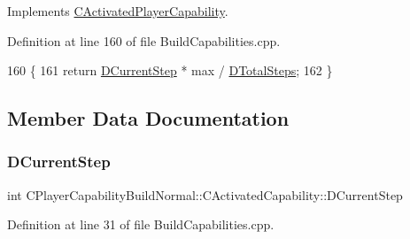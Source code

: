 Implements \hyperlink{classCActivatedPlayerCapability_a405dc6076058006a4f801727de4cfe4d}{C\+Activated\+Player\+Capability}.



Definition at line 160 of file Build\+Capabilities.\+cpp.


\begin{DoxyCode}
160                                                                             \{
161     \textcolor{keywordflow}{return} \hyperlink{classCPlayerCapabilityBuildNormal_1_1CActivatedCapability_ab6e20b5de47d912d9e38c2e8395f1ad1}{DCurrentStep} * max / \hyperlink{classCPlayerCapabilityBuildNormal_1_1CActivatedCapability_a50e3103232671fc231348e7a86c1fed5}{DTotalSteps};
162 \}
\end{DoxyCode}


\subsection{Member Data Documentation}
\hypertarget{classCPlayerCapabilityBuildNormal_1_1CActivatedCapability_ab6e20b5de47d912d9e38c2e8395f1ad1}{}\label{classCPlayerCapabilityBuildNormal_1_1CActivatedCapability_ab6e20b5de47d912d9e38c2e8395f1ad1} 
\subsubsection{\texorpdfstring{D\+Current\+Step}{DCurrentStep}}
{\footnotesize\ttfamily int C\+Player\+Capability\+Build\+Normal\+::\+C\+Activated\+Capability\+::\+D\+Current\+Step\hspace{0.3cm}{\ttfamily [protected]}}



Definition at line 31 of file Build\+Capabilities.\+cpp.

\hypertarget{classCPlayerCapabilityBuildNormal_1_1CActivatedCapability_a8997bc10da71f5df340096cd0d717d84}{}\label{classCPlayerCapabilityBuildNormal_1_1CActivatedCapability_a8997bc10da71f5df340096cd0d717d84} 
